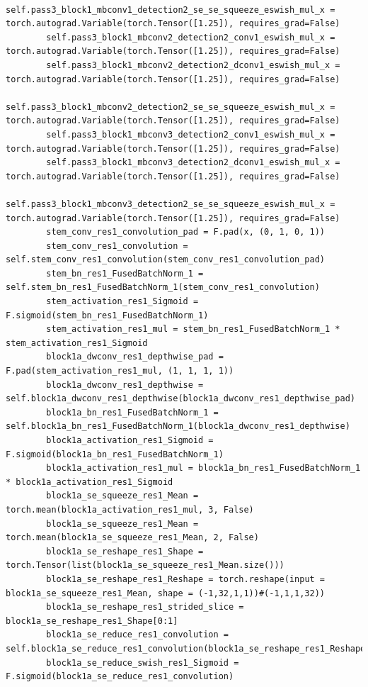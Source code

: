\documentclass{fisatprojectfinal}
\begin{document}
\begin{appendices}
\begin{lstlisting}
        self.pass3_block1_mbconv1_detection2_se_se_squeeze_eswish_mul_x = torch.autograd.Variable(torch.Tensor([1.25]), requires_grad=False)
        self.pass3_block1_mbconv2_detection2_conv1_eswish_mul_x = torch.autograd.Variable(torch.Tensor([1.25]), requires_grad=False)
        self.pass3_block1_mbconv2_detection2_dconv1_eswish_mul_x = torch.autograd.Variable(torch.Tensor([1.25]), requires_grad=False)
        self.pass3_block1_mbconv2_detection2_se_se_squeeze_eswish_mul_x = torch.autograd.Variable(torch.Tensor([1.25]), requires_grad=False)
        self.pass3_block1_mbconv3_detection2_conv1_eswish_mul_x = torch.autograd.Variable(torch.Tensor([1.25]), requires_grad=False)
        self.pass3_block1_mbconv3_detection2_dconv1_eswish_mul_x = torch.autograd.Variable(torch.Tensor([1.25]), requires_grad=False)
        self.pass3_block1_mbconv3_detection2_se_se_squeeze_eswish_mul_x = torch.autograd.Variable(torch.Tensor([1.25]), requires_grad=False)
        stem_conv_res1_convolution_pad = F.pad(x, (0, 1, 0, 1))
        stem_conv_res1_convolution = self.stem_conv_res1_convolution(stem_conv_res1_convolution_pad)
        stem_bn_res1_FusedBatchNorm_1 = self.stem_bn_res1_FusedBatchNorm_1(stem_conv_res1_convolution)
        stem_activation_res1_Sigmoid = F.sigmoid(stem_bn_res1_FusedBatchNorm_1)
        stem_activation_res1_mul = stem_bn_res1_FusedBatchNorm_1 * stem_activation_res1_Sigmoid
        block1a_dwconv_res1_depthwise_pad = F.pad(stem_activation_res1_mul, (1, 1, 1, 1))
        block1a_dwconv_res1_depthwise = self.block1a_dwconv_res1_depthwise(block1a_dwconv_res1_depthwise_pad)
        block1a_bn_res1_FusedBatchNorm_1 = self.block1a_bn_res1_FusedBatchNorm_1(block1a_dwconv_res1_depthwise)
        block1a_activation_res1_Sigmoid = F.sigmoid(block1a_bn_res1_FusedBatchNorm_1)
        block1a_activation_res1_mul = block1a_bn_res1_FusedBatchNorm_1 * block1a_activation_res1_Sigmoid
        block1a_se_squeeze_res1_Mean = torch.mean(block1a_activation_res1_mul, 3, False)
        block1a_se_squeeze_res1_Mean = torch.mean(block1a_se_squeeze_res1_Mean, 2, False)
        block1a_se_reshape_res1_Shape = torch.Tensor(list(block1a_se_squeeze_res1_Mean.size()))
        block1a_se_reshape_res1_Reshape = torch.reshape(input = block1a_se_squeeze_res1_Mean, shape = (-1,32,1,1))#(-1,1,1,32))
        block1a_se_reshape_res1_strided_slice = block1a_se_reshape_res1_Shape[0:1]
        block1a_se_reduce_res1_convolution = self.block1a_se_reduce_res1_convolution(block1a_se_reshape_res1_Reshape)
        block1a_se_reduce_swish_res1_Sigmoid = F.sigmoid(block1a_se_reduce_res1_convolution)

\end{lstlisting}
\end{appendices}
\end{document}
